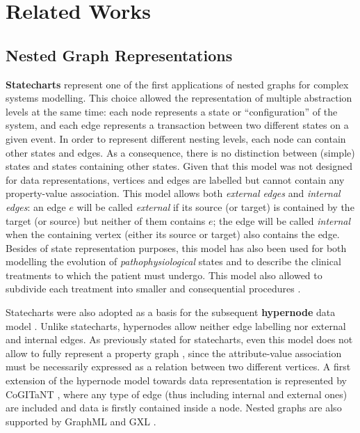 \section{Related Works}

\subsection{Nested Graph Representations}
\textbf{Statecharts} \cite{statecharts} represent one of the first applications of nested graphs for complex systems modelling. This choice allowed the representation of multiple abstraction levels at the same time: each node represents a  state or ``configuration'' of the system, and each edge represents a transaction between two different states on a given event. In order to represent different nesting levels, each node can contain other states and edges. As a consequence,  there is no distinction between (simple) states and states containing other states. Given that this model was not designed for data representations, vertices and edges are labelled but cannot contain any property-value association. 
This model allows both \textit{external edges} and \textit{internal edges}: an edge  $e$ will be called \textit{external} if its source (or target) is contained by the target (or source) but neither of them contains $e$; the edge will be called \textit{internal} when the containing vertex (either its source or target) also contains the edge. Besides of state representation purposes, this model has also been  used for both modelling the evolution of \textit{pathophysiological} states and to describe the clinical treatments to which the patient must undergo. This model also allowed to subdivide each treatment  into smaller and consequential procedures \cite{NestedGlaucoma}.

Statecharts were also adopted as a basis for the subsequent \textbf{hypernode} data model \cite{Poulovassilis1994}. Unlike statecharts, hypernodes allow neither edge labelling nor external and internal edges. As previously stated for statecharts, even this model does not allow to fully represent a property graph \cite{angles12}, since the attribute-value association must be necessarily expressed as a relation between two different vertices.  A first extension of the hypernode model towards data representation is represented by CoGITaNT \cite{GenestS98}, where any type of edge (thus including internal and external ones) are included and data is firstly contained inside a node. Nested graphs are also supported by GraphML \cite{graphml} and GXL \cite{GXL}.

